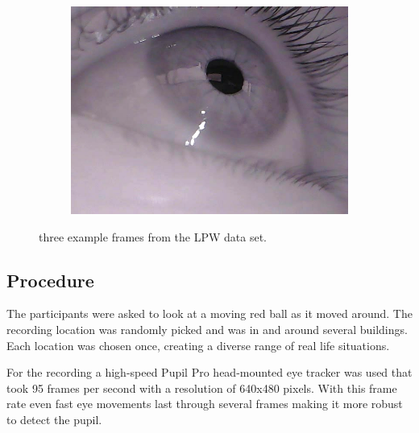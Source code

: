 \begin{figure}[ht]
\begin{subfigure}{.30\textwidth}
      \label{fig:ds2}
    \end{subfigure}%
    \begin{subfigure}{.30\textwidth}
      \centering
      \includegraphics[width=.9\linewidth]{plots/eye_dataset/eye3.png}

      \label{fig:ds3}
    \end{subfigure}
    \caption{three example frames from the LPW data set.}
    \label{fig:example_frame}
    \end{figure}

    \subsection{Procedure}
    The participants were asked to look at a moving red ball as it moved around. The recording location was randomly picked and was in and around several buildings. Each location was chosen once, creating a diverse range of real life situations. 

    For the recording a high-speed Pupil Pro head-mounted eye tracker was used that took 95 frames per second with a resolution of 640x480 pixels. With this frame rate even fast eye movements last through several frames making it more robust to detect the pupil.


